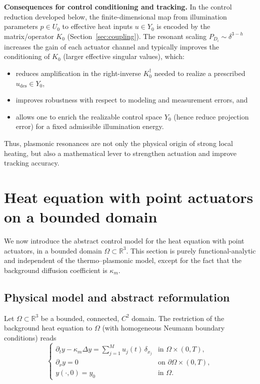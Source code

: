 \documentclass[11pt,a4paper]{article}
\numberwithin{equation}{section}
\theoremstyle{definition}
\newcommand{\R}{\mathbb{R}}
\newcommand{\Om}{\Omega}
\newcommand{\1}{\mathbbm{1}}
\newcommand{\kappam}{\kappa_m}
\begin{document}
\medskip
\noindent
\textbf{Consequences for control conditioning and tracking.}
In the control reduction developed below, the finite-dimensional map from
illumination parameters $p\in U_0$ to effective heat inputs $u\in Y_0$ is encoded by
the matrix/operator $K_0$ (Section~\ref{sec:coupling}). The resonant scaling
$P_{D_i}\sim \delta^{3-h}$ increases the gain of each actuator channel and typically
improves the conditioning of $K_0$ (larger effective singular values), which:
\begin{itemize}
\item reduces amplification in the right-inverse $K_0^\dagger$ needed to realize a
prescribed $u_{\mathrm{des}}\in Y_0$,
\item improves robustness with respect to modeling and measurement errors, and
\item allows one to enrich the realizable control space $Y_0$ (hence reduce projection
error) for a fixed admissible illumination energy.
\end{itemize}
Thus, plasmonic resonances are not only the physical origin of strong local heating,
but also a mathematical lever to strengthen actuation and improve tracking accuracy.


\section{Heat equation with point actuators on a bounded domain}
\label{sec:point-actuators}
\noindent
We now introduce the abstract control model for the heat equation with point
actuators, in a bounded domain $\Om\subset\R^3$. This section is purely
functional-analytic and independent of the thermo--plasmonic model, except
for the fact that the background diffusion coefficient is $\kappam$.

\subsection{Physical model and abstract reformulation}
\noindent
Let $\Om\subset\R^3$ be a bounded, connected, $C^2$ domain. The restriction
of the background heat equation to $\Om$ (with homogeneous Neumann boundary
conditions) reads
\begin{equation}
\label{eq:3.1}
\begin{cases}
\partial_t y - \kappam\Delta y
= \displaystyle\sum_{j=1}^M u_j(t)\,\delta_{x_j}
& \text{in }\Om\times(0,T),\\[0.3em]
\partial_\nu y = 0 & \text{on }\partial\Om\times(0,T),\\[0.3em]
y(\cdot,0) = y_0 & \text{in }\Om.
\end{cases}
\end{equation}
\end{document}
